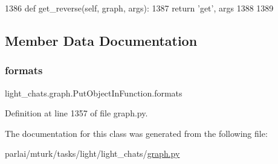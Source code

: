 \begin{DoxyCode}
1386     \textcolor{keyword}{def }get\_reverse(self, graph, args):
1387         \textcolor{keywordflow}{return} \textcolor{stringliteral}{'get'}, args
1388 
1389 
\end{DoxyCode}


\subsection{Member Data Documentation}
\mbox{\label{classlight__chats_1_1graph_1_1PutObjectInFunction_ad244ff0f442d2c6b785022457e330040}} 
\subsubsection{\texorpdfstring{formats}{formats}}
{\footnotesize\ttfamily light\+\_\+chats.\+graph.\+Put\+Object\+In\+Function.\+formats}



Definition at line 1357 of file graph.\+py.



The documentation for this class was generated from the following file\+:\begin{DoxyCompactItemize}
\item 
parlai/mturk/tasks/light/light\+\_\+chats/\hyperlink{parlai_2mturk_2tasks_2light_2light__chats_2graph_8py}{graph.\+py}\end{DoxyCompactItemize}
